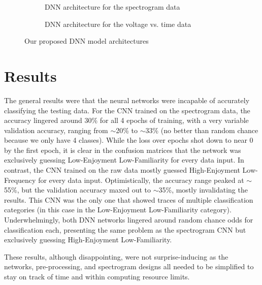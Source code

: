 \documentclass[fleqn,10pt]{SelfArx} %
\begin{document}
\begin{figure*}
    \centering
    \begin{subfigure}{0.45\linewidth}
        \centering
        
        \caption{DNN architecture for the spectrogram data}
        \label{fig:MLP_spec_model}
    \end{subfigure}
    \hfill %
    \begin{subfigure}{0.45\linewidth}
        \centering
        
        \caption{DNN architecture for the voltage vs. time data}
        \label{fig:MLP_VT_model}
    \end{subfigure}

    \caption{Our proposed DNN model architectures}
    \label{fig:DNN_models}
\end{figure*}


\section{Results }
The general results were that the neural networks were incapable of accurately classifying the testing data. For the CNN trained on the spectrogram data, the accuracy lingered around 30\% for all 4 epochs of training, with a very variable validation accuracy, ranging from $\sim$20\% to $\sim$33\% (no better than random chance because we only have 4 classes). While the loss over epochs shot down to near 0 by the first epoch, it is clear in the confusion matrices that the network was exclusively guessing Low-Enjoyment Low-Familiarity for every data input. In contrast, the CNN trained on the raw data mostly guessed High-Enjoyment Low-Frequency for every data input. Optimistically, the accuracy range peaked at $\sim$55\%, but the validation accuracy maxed out to $\sim$35\%, mostly invalidating the results. This CNN  was the only one that showed traces of multiple classification categories (in this case in the Low-Enjoyment Low-Familiarity category). Underwhelmingly, both DNN networks lingered around random chance odds for classification each, presenting the same problem as the spectrogram CNN but exclusively guessing High-Enjoyment Low-Familiarity. 

These results, although disappointing, were not surprise-inducing as the networks, pre-processing, and spectrogram designs all needed to be simplified to stay on track of time and within computing resource limits. 
\end{document}
